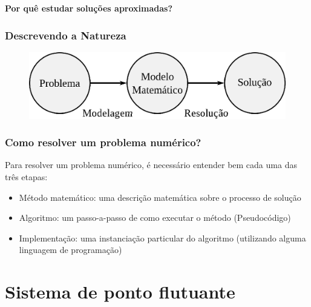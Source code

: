 \documentclass{beamer}
\begin{document}
\begin{frame}[plain]
	\centering\huge
	\bigskip
	\bigskip
	\bigskip
	\textbf{Por quê estudar soluções aproximadas?}
\end{frame}


\begin{frame}
	\frametitle{Descrevendo a Natureza}
	\begin{figure}
		\centering
		\includegraphics[width=0.7\linewidth]{Figuras/Solucao_problema}
		\label{fig:solucaoproblema}
	\end{figure}
\end{frame}

\begin{frame}
	\frametitle{Como resolver um problema numérico?}
	Para resolver um problema numérico, é necessário entender bem cada uma das três etapas:
	\begin{itemize}
		\item Método matemático: uma descrição matemática sobre o processo de solução
		\item Algoritmo: um passo-a-passo de como executar o método (Pseudocódigo)			
		\item Implementação: uma instanciação particular do algoritmo (utilizando alguma linguagem de programação)
	\end{itemize}
\end{frame}

\section{Sistema de ponto flutuante}
\end{document}
